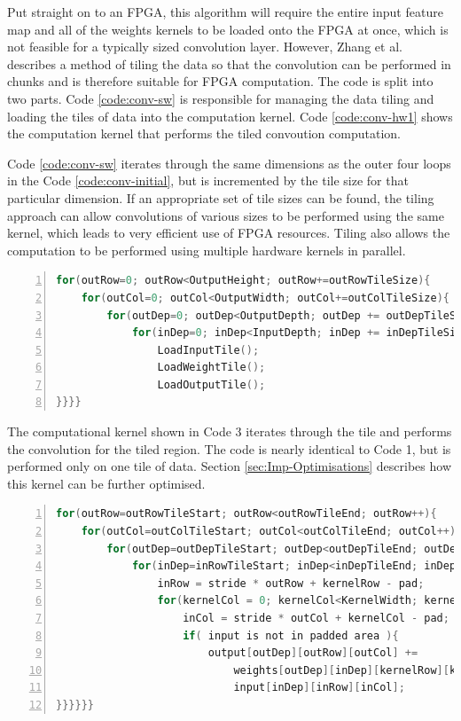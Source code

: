 \documentclass[12pt]{article}
\begin{document}
Put straight on to an FPGA, this algorithm will require the entire input feature map and all of the weights kernels to be loaded onto the FPGA at once, which is not feasible for a typically sized convolution layer. However, Zhang et al. describes a method of tiling the data so that the convolution can be performed in chunks and is therefore suitable for FPGA computation. The code is split into two parts. Code \ref{code:conv-sw}  is responsible for managing the data tiling and loading the tiles of data into the computation kernel. Code \ref{code:conv-hw1} shows the computation kernel that performs the tiled convoution computation.

Code \ref{code:conv-sw} iterates through the same dimensions as the outer four loops in the Code \ref{code:conv-initial}, but is incremented by the tile size for that particular dimension. If an appropriate set of tile sizes can be found, the tiling approach can allow convolutions of various sizes to be performed using the same kernel, which leads to very efficient use of FPGA resources. Tiling also allows the computation to be performed using multiple hardware kernels in parallel.

\renewcommand{\lstlistingname}{Code}
\begin{lstlisting}[frame=single, caption=External Data Transfer, label=code:conv-sw, captionpos=b, numbers=left, language=C]
for(outRow=0; outRow<OutputHeight; outRow+=outRowTileSize){
	for(outCol=0; outCol<OutputWidth; outCol+=outColTileSize){
		for(outDep=0; outDep<OutputDepth; outDep += outDepTileSize){
			for(inDep=0; inDep<InputDepth; inDep += inDepTileSize){
				LoadInputTile();
				LoadWeightTile();
				LoadOutputTile();
}}}}
\end{lstlisting} 

The computational kernel shown in Code 3 iterates through the tile and performs the convolution for the tiled region. The code is nearly identical to Code 1, but is performed only on one tile of data. Section \ref{sec:Imp-Optimisations} describes how this kernel can be further optimised.

\renewcommand{\lstlistingname}{Code}
\begin{lstlisting}[frame=single, caption=Computational Kernel, label=code:conv-hw1, captionpos=b, numbers=left, language=C]
for(outRow=outRowTileStart; outRow<outRowTileEnd; outRow++){
	for(outCol=outColTileStart; outCol<outColTileEnd; outCol++){
		for(outDep=outDepTileStart; outDep<outDepTileEnd; outDep++){
			for(inDep=inRowTileStart; inDep<inDepTileEnd; inDep++){
				inRow = stride * outRow + kernelRow - pad;
				for(kernelCol = 0; kernelCol<KernelWidth; kernelCol++){
					inCol = stride * outCol + kernelCol - pad;
					if( input is not in padded area ){
						output[outDep][outRow][outCol] +=
							weights[outDep][inDep][kernelRow][kernelCol] *
							input[inDep][inRow][inCol];
}}}}}}
\end{lstlisting} 
\end{document}
